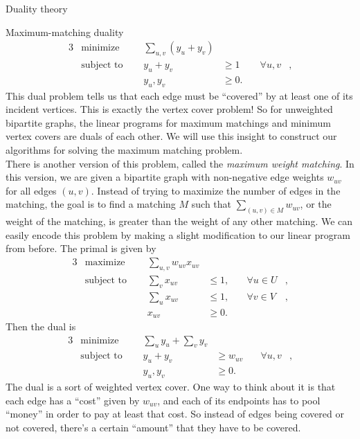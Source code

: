 \begin{section}{Duality theory}
\begin{subsection}{Maximum-matching duality}
	\begin{alignat}{3}
		& \text{minimize } & \sum_{u,v} (y_u + y_v)& \\
		& \text{subject to } \quad & y_u + y_v & \geq 1 & \quad \forall u,v &, \\
				    && y_u,y_v & \geq 0.
	\end{alignat}
	This dual problem tells us that each edge must be ``covered'' by at least one of its incident 
	vertices. This is exactly the vertex cover problem! So for unweighted bipartite graphs, the 
	linear programs for maximum matchings and minimum vertex covers are duals of each other. 
	We will use this insight to construct our algorithms for solving the maximum matching problem. 
	\\
	There is another version of this problem, called the \emph{maximum weight matching}. In this 
	version, we are given a bipartite graph with non-negative edge weights $w_{uv}$ for all 
	edges $(u,v)$. Instead of trying to maximize the number of edges in the matching, the goal 
	is to find a matching $M$ such that $\sum_{(u,v) \in M} w_{uv}$, or the weight of the matching, 
	is greater than the weight of any other matching. We can easily encode this problem by making 
	a slight modification to our linear program from before. The primal is given by
	\begin{alignat}{3}
		& \text{maximize } & \sum_{u,v} w_{uv}x_{uv}& \\
		& \text{subject to } \quad & \sum_{v} x_{uv} & \leq 1, & \quad \forall u\in U&, \\
				     &\quad & \sum_{u} x_{uv} & \leq 1, & \quad \forall v\in V &, \\
				&& x_{uv} & \geq 0.
	\end{alignat}
	Then the dual is
	\begin{alignat}{3}
		& \text{minimize } & \sum_{u} y_u + \sum_v y_v& \\
		& \text{subject to } \quad & y_u + y_v & \geq w_{uv} & \quad \forall u,v &, \\
				    && y_u,y_v & \geq 0.
	\end{alignat}
	The dual is a sort of weighted vertex cover. One way to think about it is that each edge 
	has a ``cost'' given by $w_{uv}$, and each of its endpoints has to pool ``money'' in order 
	to pay at least that cost. So instead of edges being covered or not covered, there's a certain 
	``amount'' that they have to be covered.
\end{subsection}


\end{section}
